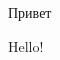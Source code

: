 \documentclass{article}
\begin{document}
Привет
\begin{english}
Hello! 
\end{english}
\end{document}
